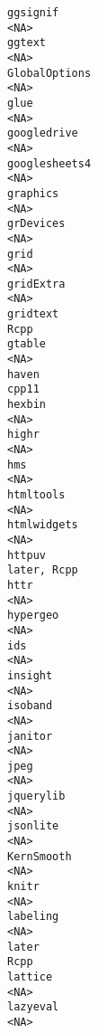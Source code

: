 \documentclass[
  letterpaper,
  DIV=11,
  numbers=noendperiod]{scrreprt}
\begin{document}
\begin{verbatim}
ggsignif                                                                 <NA>
ggtext                                                                   <NA>
GlobalOptions                                                            <NA>
glue                                                                     <NA>
googledrive                                                              <NA>
googlesheets4                                                            <NA>
graphics                                                                 <NA>
grDevices                                                                <NA>
grid                                                                     <NA>
gridExtra                                                                <NA>
gridtext                                                                 Rcpp
gtable                                                                   <NA>
haven                                                                   cpp11
hexbin                                                                   <NA>
highr                                                                    <NA>
hms                                                                      <NA>
htmltools                                                                <NA>
htmlwidgets                                                              <NA>
httpuv                                                            later, Rcpp
httr                                                                     <NA>
hypergeo                                                                 <NA>
ids                                                                      <NA>
insight                                                                  <NA>
isoband                                                                  <NA>
janitor                                                                  <NA>
jpeg                                                                     <NA>
jquerylib                                                                <NA>
jsonlite                                                                 <NA>
KernSmooth                                                               <NA>
knitr                                                                    <NA>
labeling                                                                 <NA>
later                                                                    Rcpp
lattice                                                                  <NA>
lazyeval                                                                 <NA>

\end{verbatim}
\end{document}
